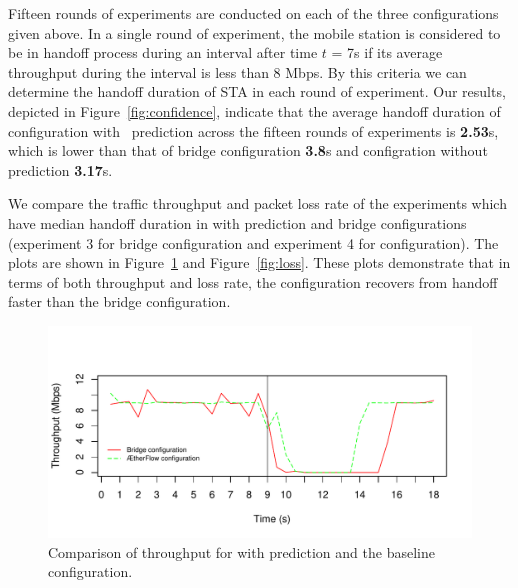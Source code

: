 
Fifteen rounds of experiments are conducted on each of the three configurations given
above. In a single round of experiment, the mobile station is considered to be
in handoff process during an interval after time $t$ = 7s if its average
throughput during the interval is less than 8 Mbps. By this criteria we can
determine the handoff duration of STA in each round of experiment. Our results, depicted  in Figure~\ref{fig:confidence}, indicate that the average handoff
duration of \aetherflow configuration with ~prediction across the fifteen rounds of experiments is
\textbf{2.53}s, which is lower than that of bridge configuration \textbf{3.8}s and \aetherflow configration without prediction \textbf{3.17}s.

We compare the traffic throughput and packet loss rate of the experiments
which have median handoff duration in \aetherflow with prediction and bridge configurations (experiment 3 for
bridge configuration and experiment 4 for \aetherflow configuration). 
The plots are shown in Figure~\ref{fig:throughput} and Figure~\ref{fig:loss}. 
These plots demonstrate that in terms of both throughput and loss rate, the \aetherflow
configuration recovers from handoff faster than the bridge configuration. 

\begin{figure}
\centering
\includegraphics[width=.8\textwidth]{figures/throughput}
\caption{Comparison of throughput for \aetherflow with prediction and the baseline configuration.} %
\label{fig:throughput}
\end{figure}

